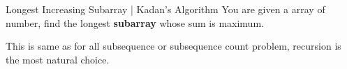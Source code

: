 
\begin{problem}[Question:]{Longest Increasing Subarray | Kadan's Algorithm}
    You are given a array of number, find the longest \textbf{subarray} whose sum is maximum.
\end{problem}

\begin{solution}[Naive]
    This is same as for all subsequence or subsequence count problem, recursion is the most natural choice.



    
\end{solution}